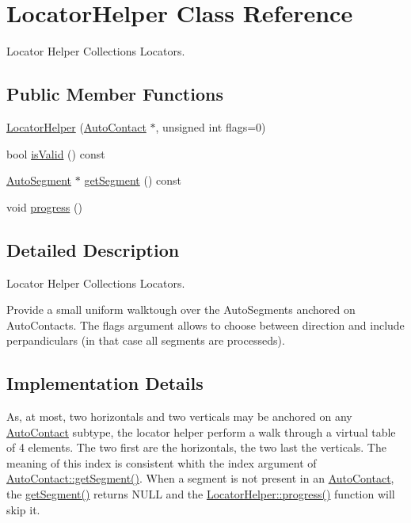 \hypertarget{classKatabatic_1_1LocatorHelper}{}\section{Locator\+Helper Class Reference}
\label{classKatabatic_1_1LocatorHelper}


Locator Helper Collection\textquotesingle{}s Locators.  


\subsection*{Public Member Functions}
\begin{DoxyCompactItemize}
\item 
\hyperlink{classKatabatic_1_1LocatorHelper_af44c2fcc73d387e3e3b5c334f25b070b}{Locator\+Helper} (\hyperlink{classKatabatic_1_1AutoContact}{Auto\+Contact} $\ast$, unsigned int flags=0)
\item 
bool \hyperlink{classKatabatic_1_1LocatorHelper_a5bc2a781be2586924afce4e4a4ea6697}{is\+Valid} () const
\item 
\hyperlink{classKatabatic_1_1AutoSegment}{Auto\+Segment} $\ast$ \hyperlink{classKatabatic_1_1LocatorHelper_ad0f8becc4187c833b6f6c5f902f8aaa5}{get\+Segment} () const
\item 
void \hyperlink{classKatabatic_1_1LocatorHelper_a1be98ae64bededebc29a04f257024ebe}{progress} ()
\end{DoxyCompactItemize}


\subsection{Detailed Description}
Locator Helper Collection\textquotesingle{}s Locators. 

Provide a small uniform walktough over the Auto\+Segments anchored on Auto\+Contacts. The {\ttfamily flags} argument allows to choose between direction and include perpandiculars (in that case all segments are processeds).\hypertarget{classKatabatic_1_1LocatorHelper_secLocHelperImplementation}{}\subsection{Implementation Details}\label{classKatabatic_1_1LocatorHelper_secLocHelperImplementation}
As, at most, two horizontals and two verticals may be anchored on any \hyperlink{classKatabatic_1_1AutoContact}{Auto\+Contact} subtype, the locator helper perform a walk through a virtual table of 4 elements. The two first are the horizontals, the two last the verticals. The meaning of this index is consistent whith the {\ttfamily index} argument of \hyperlink{classKatabatic_1_1AutoContact_a50531ded68cc5206fe104b8d8bf3bd87}{Auto\+Contact\+::get\+Segment()}. When a segment is not present in an \hyperlink{classKatabatic_1_1AutoContact}{Auto\+Contact}, the {\ttfamily \hyperlink{classKatabatic_1_1LocatorHelper_ad0f8becc4187c833b6f6c5f902f8aaa5}{get\+Segment()}} returns {\ttfamily N\+U\+LL} and the \hyperlink{classKatabatic_1_1LocatorHelper_a1be98ae64bededebc29a04f257024ebe}{Locator\+Helper\+::progress()} function will skip it.

